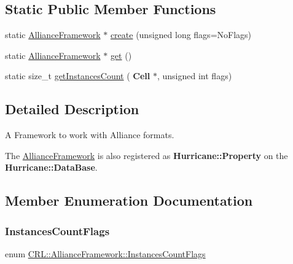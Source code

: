 \subsection*{Static Public Member Functions}
\begin{DoxyCompactItemize}
\item 
static \hyperlink{classCRL_1_1AllianceFramework}{Alliance\+Framework} $\ast$ \hyperlink{classCRL_1_1AllianceFramework_a8cff32ced8cc163cadca885d8ed8a5fc}{create} (unsigned long flags=No\+Flags)
\item 
static \hyperlink{classCRL_1_1AllianceFramework}{Alliance\+Framework} $\ast$ \hyperlink{classCRL_1_1AllianceFramework_a976479af696a86c998c10d9d2604839d}{get} ()
\item 
static size\+\_\+t \hyperlink{classCRL_1_1AllianceFramework_a95aa8c6b8ab3f995daf22a0317324933}{get\+Instances\+Count} (\textbf{ Cell} $\ast$, unsigned int flags)
\end{DoxyCompactItemize}


\subsection{Detailed Description}
A Framework to work with Alliance formats. 

The \hyperlink{classCRL_1_1AllianceFramework}{Alliance\+Framework} is also registered as \textbf{ Hurricane\+::\+Property} on the \textbf{ Hurricane\+::\+Data\+Base}. 

\subsection{Member Enumeration Documentation}
\mbox{\label{classCRL_1_1AllianceFramework_a03ef94e043d2d25eb7a6a5f1ae176432}} 
\subsubsection{\texorpdfstring{Instances\+Count\+Flags}{InstancesCountFlags}}
{\footnotesize\ttfamily enum \hyperlink{classCRL_1_1AllianceFramework_a03ef94e043d2d25eb7a6a5f1ae176432}{C\+R\+L\+::\+Alliance\+Framework\+::\+Instances\+Count\+Flags}}

